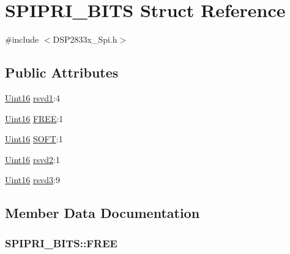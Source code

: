 \hypertarget{struct_s_p_i_p_r_i___b_i_t_s}{}\section{S\+P\+I\+P\+R\+I\+\_\+\+B\+I\+T\+S Struct Reference}
\label{struct_s_p_i_p_r_i___b_i_t_s}


{\ttfamily \#include $<$D\+S\+P2833x\+\_\+\+Spi.\+h$>$}

\subsection*{Public Attributes}
\begin{DoxyCompactItemize}
\item 
\hyperlink{_d_s_p2833x___device_8h_a59a9f6be4562c327cbfb4f7e8e18f08b}{Uint16} \hyperlink{struct_s_p_i_p_r_i___b_i_t_s_af4950cfa9895af300bbbb3da975f6ef3}{rsvd1}\+:4
\item 
\hyperlink{_d_s_p2833x___device_8h_a59a9f6be4562c327cbfb4f7e8e18f08b}{Uint16} \hyperlink{struct_s_p_i_p_r_i___b_i_t_s_af794bdd19f61f00850ade5d591e430d5}{F\+R\+E\+E}\+:1
\item 
\hyperlink{_d_s_p2833x___device_8h_a59a9f6be4562c327cbfb4f7e8e18f08b}{Uint16} \hyperlink{struct_s_p_i_p_r_i___b_i_t_s_a51dfb94c78516dc1b93ccc4b2cbb7bd1}{S\+O\+F\+T}\+:1
\item 
\hyperlink{_d_s_p2833x___device_8h_a59a9f6be4562c327cbfb4f7e8e18f08b}{Uint16} \hyperlink{struct_s_p_i_p_r_i___b_i_t_s_a025091dda7122fc9cc9a947c51161554}{rsvd2}\+:1
\item 
\hyperlink{_d_s_p2833x___device_8h_a59a9f6be4562c327cbfb4f7e8e18f08b}{Uint16} \hyperlink{struct_s_p_i_p_r_i___b_i_t_s_a5501605b5475e776d8d31e9565377a78}{rsvd3}\+:9
\end{DoxyCompactItemize}


\subsection{Member Data Documentation}
\hypertarget{struct_s_p_i_p_r_i___b_i_t_s_af794bdd19f61f00850ade5d591e430d5}{}
\subsubsection[{F\+R\+E\+E}]{ S\+P\+I\+P\+R\+I\+\_\+\+B\+I\+T\+S\+::\+F\+R\+E\+E}\label{struct_s_p_i_p_r_i___b_i_t_s_af794bdd19f61f00850ade5d591e430d5}
\hypertarget{struct_s_p_i_p_r_i___b_i_t_s_af4950cfa9895af300bbbb3da975f6ef3}{}
